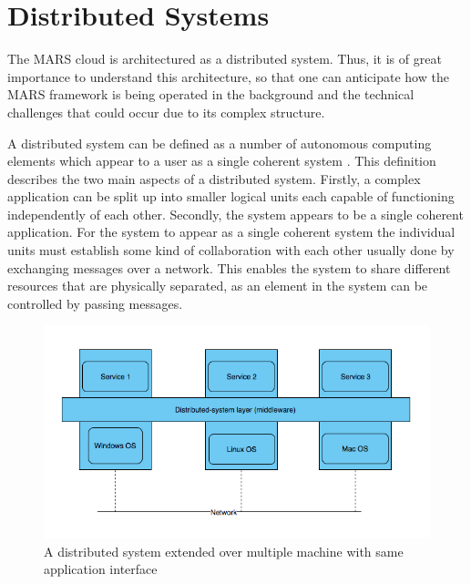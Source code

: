 \section{Distributed Systems}

    The MARS cloud is architectured as a distributed system. Thus, it is of great importance to understand
    this architecture, so that one can anticipate how the MARS framework is being operated in the background and
    the technical challenges that could occur due to its complex structure.
    \par
    A distributed system can be defined as a number of autonomous computing elements which 
    appear to a user as a single coherent system \cite[p.~2]{DistributedSystems}. This definition describes the two main aspects of a distributed system.
    Firstly, a complex application can be split up into smaller logical units each capable of functioning independently of each other.
    Secondly, the system appears 
    to be a single coherent application. For the system to appear as a single coherent system the individual units must establish some kind of collaboration
    with each other usually done by exchanging messages over a network. This enables the system to share different resources that are physically separated, 
    as an element in the system can be controlled by passing messages.


    

    \begin{figure}[H]
        \centering \includegraphics[scale=0.5]{grafiken/distributedSystem.png}
        \caption{A distributed system extended over multiple machine with same application 
        interface \cite[p.~5]{DistributedSystems}}
        \label{fig:distributedSystem}
    \end{figure}

